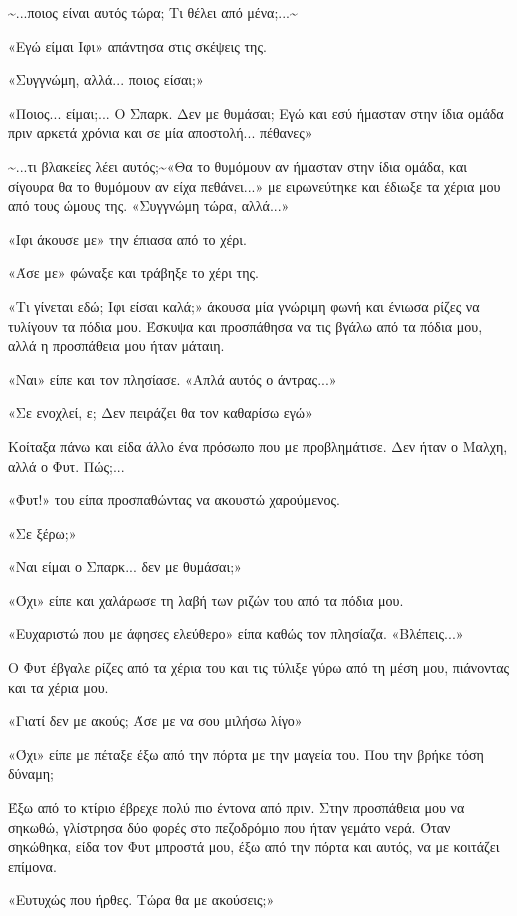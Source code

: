 \documentclass[12pt,twoside, openany]{book}
\begin{document}
\textasciitilde ...ποιος είναι αυτός τώρα; Τι θέλει από μένα;...\textasciitilde 

«Εγώ είμαι Ιφι» απάντησα στις σκέψεις της.

«Συγγνώμη, αλλά... ποιος είσαι;»

«Ποιος... είμαι;... Ο Σπαρκ. Δεν με θυμάσαι; Εγώ και εσύ ήμασταν στην ίδια ομάδα πριν αρκετά χρόνια και σε μία αποστολή... πέθανες»

\textasciitilde ...τι βλακείες λέει αυτός;\textasciitilde «Θα το θυμόμουν αν ήμασταν στην ίδια ομάδα, και σίγουρα θα το θυμόμουν αν είχα πεθάνει...» με ειρωνεύτηκε και έδιωξε τα χέρια μου από τους ώμους της. «Συγγνώμη τώρα, αλλά...»

«Ιφι άκουσε με» την έπιασα από το χέρι.

«Άσε με» φώναξε και τράβηξε το χέρι της.

«Τι γίνεται εδώ; Ιφι είσαι καλά;» άκουσα μία γνώριμη φωνή και ένιωσα ρίζες να τυλίγουν τα πόδια μου. Έσκυψα και προσπάθησα να τις βγάλω από τα πόδια μου, αλλά η προσπάθεια μου ήταν μάταιη. 

«Ναι» είπε και τον πλησίασε. «Απλά αυτός ο άντρας...»

«Σε ενοχλεί, ε; Δεν πειράζει θα τον καθαρίσω εγώ»

Κοίταξα πάνω και είδα άλλο ένα πρόσωπο που με προβλημάτισε. Δεν ήταν ο Μαλχη, αλλά ο Φυτ. Πώς;...

«Φυτ!» του είπα προσπαθώντας να ακουστώ χαρούμενος.

«Σε ξέρω;»

«Ναι είμαι ο Σπαρκ... δεν με θυμάσαι;»

«Όχι» είπε και χαλάρωσε τη λαβή των ριζών του από τα πόδια μου.

«Ευχαριστώ που με άφησες ελεύθερο» είπα καθώς τον πλησίαζα. «Βλέπεις...»

Ο Φυτ έβγαλε ρίζες από τα χέρια του και τις τύλιξε γύρω από τη μέση μου, πιάνοντας και τα χέρια μου.

«Γιατί δεν με ακούς; Άσε με να σου μιλήσω λίγο»

«Όχι» είπε με πέταξε έξω από την πόρτα με την μαγεία του. Που την βρήκε τόση δύναμη;

Έξω από το κτίριο έβρεχε πολύ πιο έντονα από πριν. Στην προσπάθεια μου να σηκωθώ, γλίστρησα δύο φορές στο πεζοδρόμιο που ήταν γεμάτο νερά. Όταν σηκώθηκα, είδα τον Φυτ μπροστά μου, έξω από την πόρτα και αυτός, να με κοιτάζει επίμονα.

«Ευτυχώς που ήρθες. Τώρα θα με ακούσεις;»
\end{document}
